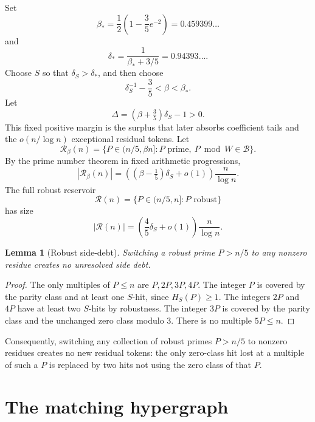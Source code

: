 \documentclass[11pt]{article}
\newtheorem{lemma}[theorem]{Lemma}
\newcommand{\R}{\mathcal R}
\newcommand{\B}{\mathcal B}
\begin{document}
Set
\[
  \beta_*=\frac12\left(1-\frac35e^{-2}\right)=0.459399\ldots
\]
and
\[
  \delta_*=\frac1{\beta_*+3/5}=0.94393\ldots .
\]
Choose \(S\) so that \(\delta_S>\delta_*\), and then choose
\[
  \delta_S^{-1}-\frac35<\beta<\beta_*.
  \tag{1}
\]
Let
\[
  \Delta=(\beta+\tfrac35)\delta_S-1>0.
  \tag{2}
\]
This fixed positive margin is the surplus that later absorbs coefficient tails
and the \(o(n/\log n)\) exceptional residual tokens.
Let
\[
  \R_\beta(n)=\{P\in(n/5,\beta n]: P\text{ prime},\ P\bmod W\in\B\}.
\]
By the prime number theorem in fixed arithmetic progressions,
\[
  |\R_\beta(n)|=\left((\beta-\tfrac15)\delta_S+o(1)\right)\frac n{\log n}.
\]
The full robust reservoir
\[
  \R(n)=\{P\in(n/5,n]:P\text{ robust}\}
\]
has size
\[
  |\R(n)|=\left(\frac45\delta_S+o(1)\right)\frac n{\log n}.
\]

\begin{lemma}[Robust side-debt]
Switching a robust prime \(P>n/5\) to any nonzero residue creates no unresolved
side debt.
\end{lemma}

\begin{proof}
The only multiples of \(P\le n\) are \(P,2P,3P,4P\).  The integer \(P\) is
covered by the parity class and at least one \(S\)-hit, since \(H_S(P)\ge1\).
The integers \(2P\) and \(4P\) have at least two \(S\)-hits by robustness.  The
integer \(3P\) is covered by the parity class and the unchanged zero class
modulo \(3\).  There is no multiple \(5P\le n\).
\end{proof}

Consequently, switching any collection of robust primes \(P>n/5\) to nonzero
residues creates no new residual tokens: the only zero-class hit lost at a
multiple of such a \(P\) is replaced by two hits not using the zero class of
that \(P\).

\section{The matching hypergraph}
\end{document}
